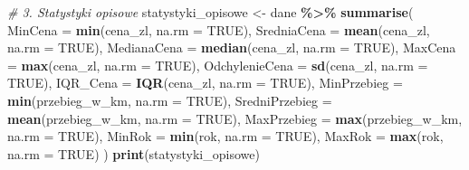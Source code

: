 \documentclass[
]{article}
\newenvironment{Shaded}{\begin{snugshade}}{\end{snugshade}}
\newcommand{\AttributeTok}[1]{\textcolor[rgb]{0.13,0.29,0.53}{#1}}
\newcommand{\CommentTok}[1]{\textcolor[rgb]{0.56,0.35,0.01}{\textit{#1}}}
\newcommand{\ConstantTok}[1]{\textcolor[rgb]{0.56,0.35,0.01}{#1}}
\newcommand{\FunctionTok}[1]{\textcolor[rgb]{0.13,0.29,0.53}{\textbf{#1}}}
\newcommand{\NormalTok}[1]{#1}
\newcommand{\OtherTok}[1]{\textcolor[rgb]{0.56,0.35,0.01}{#1}}
\newcommand{\SpecialCharTok}[1]{\textcolor[rgb]{0.81,0.36,0.00}{\textbf{#1}}}
\begin{document}
\begin{Shaded}
\begin{Highlighting}[]
\CommentTok{\# 3. Statystyki opisowe}
\NormalTok{statystyki\_opisowe }\OtherTok{\textless{}{-}}\NormalTok{ dane }\SpecialCharTok{\%\textgreater{}\%}
  \FunctionTok{summarise}\NormalTok{(}
    \AttributeTok{MinCena =} \FunctionTok{min}\NormalTok{(cena\_zl, }\AttributeTok{na.rm =} \ConstantTok{TRUE}\NormalTok{),}
    \AttributeTok{SredniaCena =} \FunctionTok{mean}\NormalTok{(cena\_zl, }\AttributeTok{na.rm =} \ConstantTok{TRUE}\NormalTok{),}
    \AttributeTok{MedianaCena =} \FunctionTok{median}\NormalTok{(cena\_zl, }\AttributeTok{na.rm =} \ConstantTok{TRUE}\NormalTok{),}
    \AttributeTok{MaxCena =} \FunctionTok{max}\NormalTok{(cena\_zl, }\AttributeTok{na.rm =} \ConstantTok{TRUE}\NormalTok{),}
    \AttributeTok{OdchylenieCena =} \FunctionTok{sd}\NormalTok{(cena\_zl, }\AttributeTok{na.rm =} \ConstantTok{TRUE}\NormalTok{),}
    \AttributeTok{IQR\_Cena =} \FunctionTok{IQR}\NormalTok{(cena\_zl, }\AttributeTok{na.rm =} \ConstantTok{TRUE}\NormalTok{),}
    \AttributeTok{MinPrzebieg =} \FunctionTok{min}\NormalTok{(przebieg\_w\_km, }\AttributeTok{na.rm =} \ConstantTok{TRUE}\NormalTok{),}
    \AttributeTok{SredniPrzebieg =} \FunctionTok{mean}\NormalTok{(przebieg\_w\_km, }\AttributeTok{na.rm =} \ConstantTok{TRUE}\NormalTok{),}
    \AttributeTok{MaxPrzebieg =} \FunctionTok{max}\NormalTok{(przebieg\_w\_km, }\AttributeTok{na.rm =} \ConstantTok{TRUE}\NormalTok{),}
    \AttributeTok{MinRok =} \FunctionTok{min}\NormalTok{(rok, }\AttributeTok{na.rm =} \ConstantTok{TRUE}\NormalTok{),}
    \AttributeTok{MaxRok =} \FunctionTok{max}\NormalTok{(rok, }\AttributeTok{na.rm =} \ConstantTok{TRUE}\NormalTok{)}
\NormalTok{  )}
\FunctionTok{print}\NormalTok{(statystyki\_opisowe)}


\end{Highlighting}
\end{Shaded}
\end{document}
